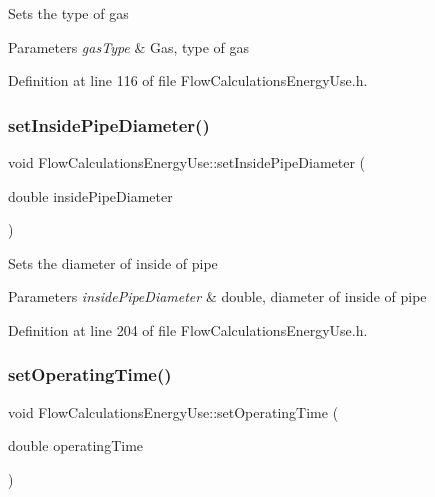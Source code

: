 Sets the type of gas


\begin{DoxyParams}{Parameters}
{\em gas\+Type} & Gas, type of gas \\
\hline
\end{DoxyParams}


Definition at line 116 of file Flow\+Calculations\+Energy\+Use.\+h.

\mbox{\label{class_flow_calculations_energy_use_a616486580460b616a7a8c4935119cd6c}} 
\subsubsection{\texorpdfstring{set\+Inside\+Pipe\+Diameter()}{setInsidePipeDiameter()}}
{\footnotesize\ttfamily void Flow\+Calculations\+Energy\+Use\+::set\+Inside\+Pipe\+Diameter (\begin{DoxyParamCaption}\item[{double}]{inside\+Pipe\+Diameter }\end{DoxyParamCaption})\hspace{0.3cm}{\ttfamily [inline]}}

Sets the diameter of inside of pipe


\begin{DoxyParams}{Parameters}
{\em inside\+Pipe\+Diameter} & double, diameter of inside of pipe \\
\hline
\end{DoxyParams}


Definition at line 204 of file Flow\+Calculations\+Energy\+Use.\+h.

\mbox{\label{class_flow_calculations_energy_use_ac82800d533502c7836238dcab1f39fac}} 
\subsubsection{\texorpdfstring{set\+Operating\+Time()}{setOperatingTime()}}
{\footnotesize\ttfamily void Flow\+Calculations\+Energy\+Use\+::set\+Operating\+Time (\begin{DoxyParamCaption}\item[{double}]{operating\+Time }\end{DoxyParamCaption})\hspace{0.3cm}{\ttfamily [inline]}}


